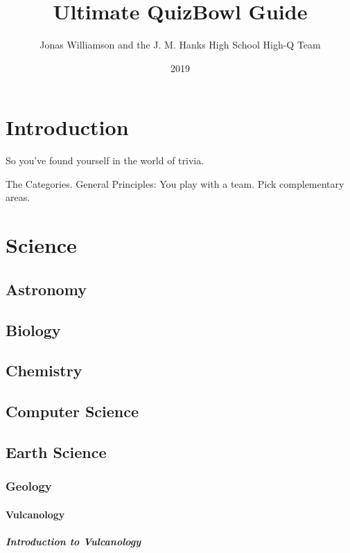 \documentclass{book}
\begin{document}
	\frontmatter
	\title{Ultimate QuizBowl Guide}
	\author{Jonas Williamson and the  J. M. Hanks High School High-Q Team}
	\date{2019}
	\maketitle
	\begin{center}
			\huge \cc \byncsa
	\end{center}

	\normalsize
	\tableofcontents

	\mainmatter

\chapter{Introduction}
So you've found yourself in the world of trivia.  

The Categories.
General Principles: You play with a team.  Pick complementary areas.  



\chapter{Science}
	\section{Astronomy}
	\section{Biology}
	\section{Chemistry}
	\section{Computer Science}
	\newpage
	\section{Earth Science}
		\subsection{Geology}
			\subsubsection{Vulcanology}
			\paragraph{Introduction to Vulcanology}
\end{document}
